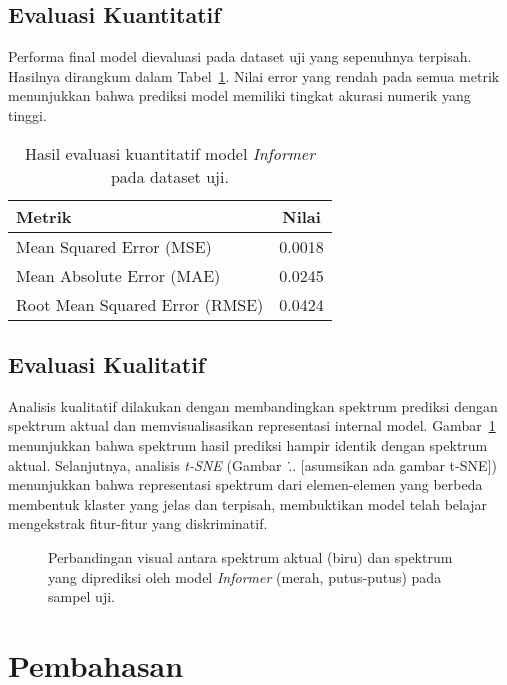 \subsection{Evaluasi Kuantitatif}
Performa final model dievaluasi pada dataset uji yang sepenuhnya terpisah. Hasilnya dirangkum dalam Tabel~\ref{tab:hasil_kuantitatif}. Nilai error yang rendah pada semua metrik menunjukkan bahwa prediksi model memiliki tingkat akurasi numerik yang tinggi.

\begin{table}[H]
  \centering
  \caption{Hasil evaluasi kuantitatif model \textit{Informer} pada dataset uji.}
  \label{tab:hasil_kuantitatif}
  \begin{tabular}{lc}
    \toprule
    \textbf{Metrik} & \textbf{Nilai} \\
    \midrule
    Mean Squared Error (MSE) & 0.0018 \\
    Mean Absolute Error (MAE) & 0.0245 \\
    Root Mean Squared Error (RMSE) & 0.0424 \\
    \bottomrule
  \end{tabular}
\end{table}

\subsection{Evaluasi Kualitatif}
Analisis kualitatif dilakukan dengan membandingkan spektrum prediksi dengan spektrum aktual dan memvisualisasikan representasi internal model. Gambar~\ref{fig:prediksi_vs_aktual} menunjukkan bahwa spektrum hasil prediksi hampir identik dengan spektrum aktual. Selanjutnya, analisis \textit{t-SNE} (Gambar~\... [asumsikan ada gambar t-SNE]) menunjukkan bahwa representasi spektrum dari elemen-elemen yang berbeda membentuk klaster yang jelas dan terpisah, membuktikan model telah belajar mengekstrak fitur-fitur yang diskriminatif.

\begin{figure}[H]
    \centering
    \caption{Perbandingan visual antara spektrum aktual (biru) dan spektrum yang diprediksi oleh model \textit{Informer} (merah, putus-putus) pada sampel uji.}
    \label{fig:prediksi_vs_aktual}
\end{figure}

\section{Pembahasan}

